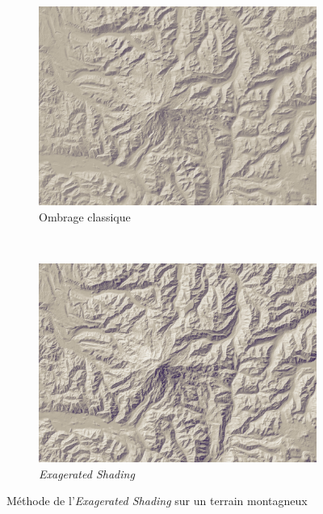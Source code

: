 \begin{figure}[h!]
\centering
 \begin{subfigure}[t]{0.47\textwidth}
 \centering
 \includegraphics[width=1.0\linewidth]{Etat_de_l_art/terrain_diffuse.jpg}
 \caption{Ombrage classique}
 \end{subfigure}%
 ~
 \hspace{.05\textwidth}
 \begin{subfigure}[t]{0.47\textwidth}
 \centering
 \includegraphics[width=1.0\linewidth]{Etat_de_l_art/terrain_exag.jpg}
 \caption{\textit{Exagerated Shading}}
 \end{subfigure}
 \caption{\label{fig:exageratedShading} Méthode de l'\textit{Exagerated Shading} sur un terrain montagneux}
\end{figure}

